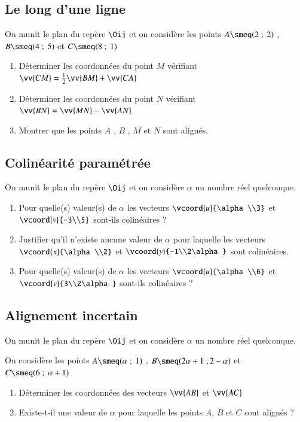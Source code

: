 \documentclass[oneside,12pt]{article}          %
\begin{document}
\subsection{Le long d'une ligne}
On munit le plan du repère $\Oij$ et on considère les points $A\smeq(2~;~2)$ , $B\smeq(4~;~5)$ et $C\smeq(8~;~1)$
\begin{enumerate}
	 \item Déterminer les coordonnées du point $M$ vérifiant $\vv{CM}=\frac{1}{2}\vv{BM}+\vv{CA}$
	 \item Déterminer les coordonnées du point $N$ vérifiant $\vv{BN}=\vv{MN}-\vv{AN}$
	 \item Montrer que les points $A$ , $B$ , $M$ et $N$ sont alignés.
\end{enumerate}



\subsection{Colinéarité paramétrée}
On munit le plan du repère $\Oij$ et on considère $\alpha$ un nombre réel quelconque.
\begin{enumerate}
	\item Pour quelle(s) valeur(s) de $\alpha$ les vecteurs $\vcoord{u}{\alpha\\3}$ et $\vcoord{v}{-3\\5}$ sont-ils colinéaires ?
	\item Justifier qu'il n'existe aucune valeur de $\alpha$ pour laquelle les vecteurs $\vcoord{x}{\alpha\\2}$ et $\vcoord{y}{-1\\2\alpha}$ sont colinéaires.
	\item Pour quelle(s) valeur(s) de $\alpha$ les vecteurs $\vcoord{u}{\alpha\\6}$ et $\vcoord{v}{3\\2\alpha}$ sont-ils colinéaires ?
\end{enumerate}



\subsection{Alignement incertain}
On munit le plan du repère $\Oij$ et on considère $\alpha$ un nombre réel quelconque.

On considère les points $A\smeq(\alpha~;~1)$ , $B\smeq(2\alpha+1~;2-\alpha)$ et $C\smeq(6~;~\alpha+1)$
\begin{enumerate}
	\item Déterminer les coordonnées des vecteurs $\vv{AB}$ et $\vv{AC}$
	\item Existe-t-il une valeur de $\alpha$ pour laquelle les points $A$, $B$ et $C$ sont alignés ?
\end{enumerate}
\end{document}

